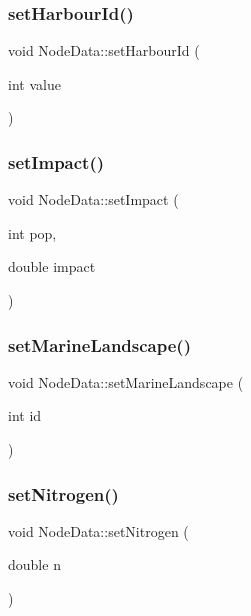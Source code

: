 \subsubsection{\texorpdfstring{setHarbourId()}{setHarbourId()}}
{\footnotesize\ttfamily void Node\+Data\+::set\+Harbour\+Id (\begin{DoxyParamCaption}\item[{int}]{value }\end{DoxyParamCaption})}

\mbox{\label{class_node_data_a3df40665aa9d86d290a978a660c06427}} 
\subsubsection{\texorpdfstring{setImpact()}{setImpact()}}
{\footnotesize\ttfamily void Node\+Data\+::set\+Impact (\begin{DoxyParamCaption}\item[{int}]{pop,  }\item[{double}]{impact }\end{DoxyParamCaption})}

\mbox{\label{class_node_data_aade4b2d620f642cdcb4a60135ce07ac3}} 
\subsubsection{\texorpdfstring{setMarineLandscape()}{setMarineLandscape()}}
{\footnotesize\ttfamily void Node\+Data\+::set\+Marine\+Landscape (\begin{DoxyParamCaption}\item[{int}]{id }\end{DoxyParamCaption})\hspace{0.3cm}{\ttfamily [inline]}}

\mbox{\label{class_node_data_afa127c82afea0d675bcf60e8c5f71418}} 
\subsubsection{\texorpdfstring{setNitrogen()}{setNitrogen()}}
{\footnotesize\ttfamily void Node\+Data\+::set\+Nitrogen (\begin{DoxyParamCaption}\item[{double}]{n }\end{DoxyParamCaption})\hspace{0.3cm}{\ttfamily [inline]}}

